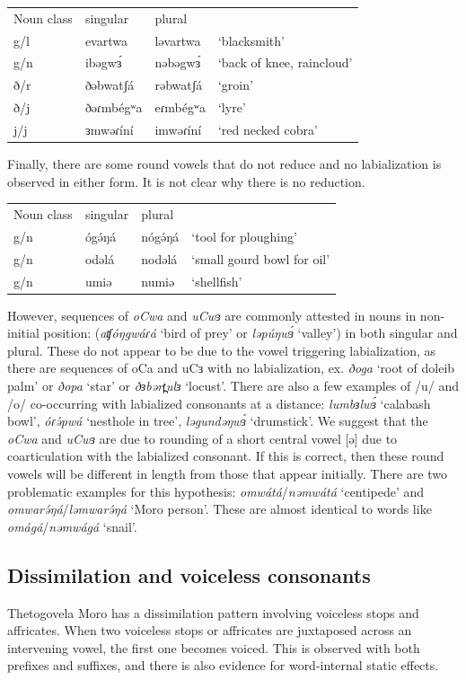 \ea
\begin{tabular}[t]{llll}
	Noun class	&	singular		&	plural\\
	g/l			&	evartwa		&	ləvartwa	&	‘blacksmith’\\
	g/n			&	ibəgwɜ́		&	nəbəgwɜ́	&	‘back of knee, raincloud’\\
	ð/r			&	ðəbwatʃá	&	rəbwatʃá&	‘groin’\\
	ð/j			&	ðəɾmbégʷa	&	eɾmbégʷa&	‘lyre’\\
	j/j			&	ɜmwəɾíní	&	imwəɾíní&	‘red necked cobra’\\
\end{tabular}
\z

Finally, there are some round vowels that do not reduce and no labialization is observed in either form. It is not clear why there is no reduction. 

\ea
\begin{tabular}[t]{llll}
Noun class		&	singular&	plural\\
g/n	&	ógə́ŋá	&	nógə́ŋá	&	‘tool for ploughing’\\
g/n	&	odəlá	&	nodəlá	&	‘small gourd bowl for oil’\\
g/n	&	umiə	&	numiə	&	‘shellfish’\\
\end{tabular}
\z

However, sequences of \textit{oCwa} and \textit{uCwɜ} are commonly attested in nouns in non-initial position: (\textit{aʧóŋgwáɾá} ‘bird of prey’ or \textit{ləpúŋwɜ́} ‘valley’) in both singular and plural. These do not appear to be due to the vowel triggering labialization, as there are sequences of oCa and uCɜ with no labialization, ex. \textit{ðoga} ‘root of doleib palm’ or \textit{ðopa} ‘star’ or \textit{ðɜbərt̪ulɜ} ‘locust’. There are also a few examples of /u/ and /o/ co-occurring with labialized consonants at a distance: \textit{lumbɜlwɜ́} ‘calabash bowl’, \textit{óɾə́pwá} ‘nesthole in tree’, \textit{ləgundəŋwɜ́} ‘drumstick’. We suggest that the \textit{oCwa} and \textit{uCwɜ} are due to rounding of a short central vowel [ə] due to coarticulation with the labialized consonant. If this is correct, then these round vowels will be different in length from those that appear initially. There are two problematic examples for this hypothesis: \textit{omwátá}/\textit{nəmwátá} ‘centipede’ and \textit{omwarə́ŋá}/\textit{ləmwarə́ŋá} ‘Moro person’. These are almost identical to words like \textit{omágá}/\textit{nəmwágá} ‘snail’.

\subsection{Dissimilation and voiceless consonants}
Thetogovela Moro has a dissimilation pattern involving voiceless stops and affricates. When two voiceless stops or affricates are juxtaposed across an intervening vowel, the first one becomes voiced. This is observed with both prefixes and suffixes, and there is also evidence for word-internal static effects. 

